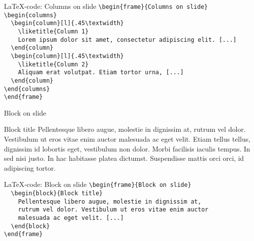 \toggleslidecolors
\begin{frame}[fragile]{\LaTeX-code: Columns on slide}
\footnotesize
\verb|\begin{frame}{Columns on slide}|\\
\verb|\begin{columns}|\\
\verb|  \begin{column}[l]{.45\textwidth}|\\
\verb|    \liketitle{Column 1}|\\
\verb|    Lorem ipsum dolor sit amet, consectetur adipiscing elit. [...]|\\
\verb|  \end{column}|\\
\verb|  \begin{column}[l]{.45\textwidth}|\\
\verb|    \liketitle{Column 2}|\\
\verb|    Aliquam erat volutpat. Etiam tortor urna, [...]|\\
\verb|  \end{column}|\\
\verb|\end{columns}|\\
\verb|\end{frame}|\\
\end{frame}
\toggleslidecolors

\begin{frame}{Block on slide}
\begin{block}{Block title}
Pellentesque libero augue, molestie in dignissim at, rutrum vel dolor. Vestibulum ut eros vitae enim auctor malesuada ac eget velit. Etiam tellus tellus, dignissim id lobortis eget, vestibulum non dolor. Morbi facilisis iaculis tempus. In sed nisi justo. In hac habitasse platea dictumst. Suspendisse mattis orci orci, id adipiscing tortor.
\end{block}
\end{frame}

\toggleslidecolors
\begin{frame}[fragile]{\LaTeX-code: Block on slide}
\footnotesize
\verb|\begin{frame}{Block on slide}|\\
\verb|  \begin{block}{Block title}|\\
\verb|    Pellentesque libero augue, molestie in dignissim at,|\\
\verb|    rutrum vel dolor. Vestibulum ut eros vitae enim auctor|\\
\verb|    malesuada ac eget velit. [...]|\\
\verb|  \end{block}|\\
\verb|\end{frame}|\\
\end{frame}
\toggleslidecolors

